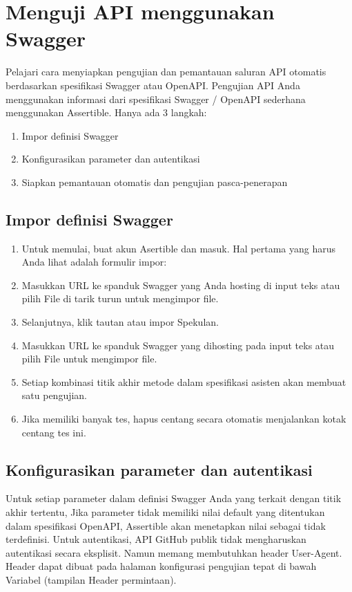 \documentclass[12pt,a4paper]{article}
\begin{document}
\section{Menguji API menggunakan Swagger}
Pelajari cara menyiapkan pengujian dan pemantauan saluran API otomatis berdasarkan spesifikasi Swagger atau OpenAPI.
Pengujian API Anda menggunakan informasi dari spesifikasi Swagger / OpenAPI sederhana menggunakan Assertible. Hanya ada 3 langkah:
\begin{enumerate}
\item Impor definisi Swagger
\item Konfigurasikan parameter dan autentikasi
\item Siapkan pemantauan otomatis dan pengujian pasca-penerapan
\end{enumerate}

\subsection{Impor definisi Swagger}
\begin{enumerate}
\item Untuk memulai, buat akun Asertible dan masuk. Hal pertama yang harus Anda lihat adalah formulir impor:
\item Masukkan URL ke spanduk Swagger yang Anda hosting di input teks atau pilih File di tarik turun untuk mengimpor file.
\item Selanjutnya, klik tautan atau impor Spekulan.
\item Masukkan URL ke spanduk Swagger yang dihosting pada input teks atau pilih File untuk mengimpor file.
\item Setiap kombinasi titik akhir metode dalam spesifikasi asisten akan membuat satu pengujian.
\item Jika  memiliki banyak tes, hapus centang secara otomatis menjalankan kotak centang tes ini.
\end{enumerate}

\subsection{Konfigurasikan parameter dan autentikasi}
Untuk setiap parameter dalam definisi Swagger Anda yang terkait dengan titik akhir tertentu, Jika parameter tidak memiliki nilai default yang ditentukan dalam spesifikasi OpenAPI, Assertible akan menetapkan nilai sebagai tidak terdefinisi.
Untuk autentikasi, API GitHub publik tidak mengharuskan autentikasi secara eksplisit. Namun memang membutuhkan header User-Agent. Header dapat dibuat pada halaman konfigurasi pengujian tepat di bawah Variabel (tampilan Header permintaan).
\end{document}
